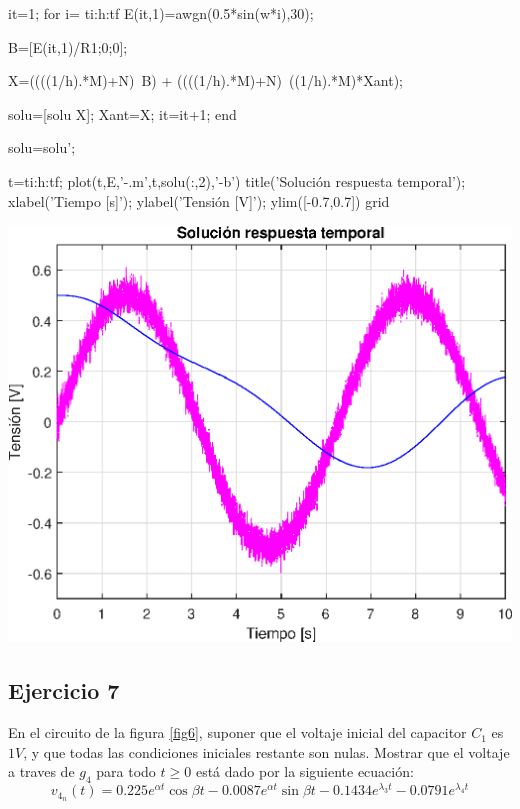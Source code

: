 \documentclass[10pt,a4paper]{article} %
\begin{document}
	
	\begin{matlabcode}
		it=1;
		for i= ti:h:tf
		E(it,1)=awgn(0.5*sin(w*i),30);
		
		B=[E(it,1)/R1;0;0];
		
		X=((((1/h).*M)+N)\ B) + ((((1/h).*M)+N)\ ((1/h).*M)*Xant);
		
		solu=[solu X];
		Xant=X;
		it=it+1;
		end
		\end{matlabcode}
		
		\vspace{1em}
		
		\begin{matlabcode}
		solu=solu';
		\end{matlabcode}
		
		
		\begin{matlabcode}
		t=ti:h:tf;
		plot(t,E,'-.m',t,solu(:,2),'-b')
		title('Solución respuesta temporal');
		xlabel('Tiempo [s]');
		ylabel('Tensión [V]');
		ylim([-0.7,0.7])
		grid
		\end{matlabcode}
		\begin{center}
		\includegraphics[width=\maxwidth{56.196688409433015em}]{figure_0_06}
		\end{center}
		
		
	\subsection{Ejercicio 7} En el circuito de la figura \ref{fig6}, suponer que el voltaje inicial del capacitor $C_1$ es $1V$, y que todas las condiciones iniciales restante son nulas. Mostrar que el voltaje a traves de $g_4$ para todo $t\geq 0$ está dado por la siguiente ecuación:
	\begin{equation}
		v_{4_n}(t)=0.225e^{\alpha t}\cos \beta t-0.0087e^{\alpha t}\sin \beta t-0.1434e^{\lambda_3 t}-0.0791e^{\lambda_4 t}
	\end{equation}
	
\end{document}
